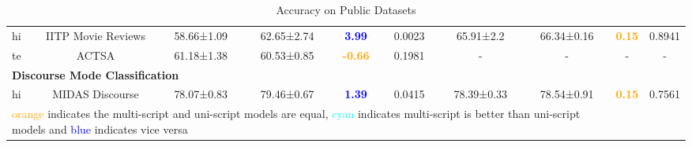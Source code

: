 \documentclass[11pt]{article}
\begin{document}
\begin{table*}[hbt!]
\begin{adjustbox}{max width=\textwidth}
\begin{tabular}{l c| c c c c| c c c c}
hi          & IITP Movie Reviews & 58.66±1.09 & 62.65±2.74 & \textcolor{blue}{\textbf{3.99}} &0.0023 & 65.91±2.2 & 66.34±0.16  & \textcolor{orange}{\textbf{0.15}} & 0.8941  \\
te          & ACTSA & 61.18±1.38 & 60.53±0.85 & \textcolor{orange}{\textbf{-0.66}} &0.1981 &- &- &- &-  \\
\midrule[2pt]
\multicolumn{8}{l}{\textbf{Discourse Mode Classification}}\\
hi          & MIDAS Discourse & 78.07±0.83 & 79.46±0.67 & \textcolor{blue}{\textbf{1.39}} &0.0415 & 78.39±0.33 & 78.54±0.91 & \textcolor{orange}{\textbf{0.15}} & 0.7561  \\
\bottomrule[2pt]
\multicolumn{8}{l}{\textcolor{orange}{orange} indicates the multi-script and uni-script models are equal, \textcolor{cyan}{cyan} indicates multi-script is better than uni-script models and \textcolor{blue}{blue} indicates vice versa}
\end{tabular}
\end{adjustbox}
\caption{Accuracy on Public Datasets}
\label{table-res-pb}
\end{table*}
\end{document}
